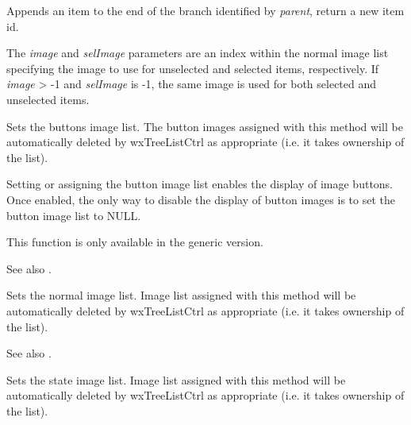\label{wxtreelistctrlappenditem}


Appends an item to the end of the branch identified by {\it parent}, return a new item id.

The {\it image} and {\it selImage} parameters are an index within
the normal image list specifying the image to use for unselected and
selected items, respectively.
If {\it image} > -1 and {\it selImage} is -1, the same image is used for
both selected and unselected items.

\label{wxtreelistctrlassignbuttonsimagelist}


Sets the buttons image list. The button images assigned with this method will
be automatically deleted by wxTreeListCtrl as appropriate
(i.e. it takes ownership of the list).

Setting or assigning the button image list enables the display of image buttons.
Once enabled, the only way to disable the display of button images is to set
the button image list to NULL.

This function is only available in the generic version.

See also .

\label{wxtreelistctrlassignimagelist}


Sets the normal image list. Image list assigned with this method will
be automatically deleted by wxTreeListCtrl as appropriate
(i.e. it takes ownership of the list).

See also .

\label{wxtreelistctrlassignstateimagelist}


Sets the state image list. Image list assigned with this method will
be automatically deleted by wxTreeListCtrl as appropriate
(i.e. it takes ownership of the list).

